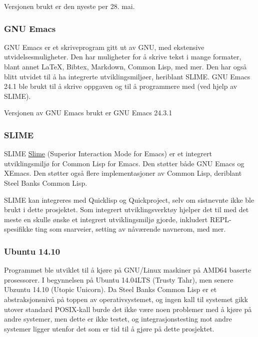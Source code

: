\documentclass[norsk, 11pt, a4paper]{article}
\begin{document}
Versjonen brukt er den nyeste per 28. mai.



\subsubsection{GNU Emacs}



GNU Emacs er et skriveprogram gitt ut av GNU, med ekstensive utvidelsesmuligheter. Den har muligheter for å skrive tekst i mange formater, blant annet LaTeX, Bibtex, Markdown, Common Lisp, med mer. Den har også blitt utvidet til å ha integrerte utviklingsmiljøer, heriblant SLIME. GNU Emacs 24.1 ble brukt til å skrive oppgaven og til å programmere med (ved hjelp av SLIME).



Versjonen av GNU Emacs brukt er GNU Emacs 24.3.1



\subsubsection{SLIME}



SLIME \href{https://common-lisp.net/project/slime/}{Slime} (Superior Interaction Mode for Emacs) er et integrert utviklingsmiljø for Common Lisp for Emacs. Den støtter både GNU Emacs og XEmacs. Den støtter også flere implementasjoner av Common Lisp, deriblant Steel Banks Common Lisp.



SLIME kan integreres med Quicklisp og Quickproject, selv om sistnevnte ikke ble brukt i dette prosjektet.
Som integrert utviklingsverktøy hjelper det til med det meste en skulle ønske et integrert utviklingsmiljø gjorde, inkludert REPL-spesifikke ting som snarveier, setting av nåværende navnerom, med mer.



\subsubsection{Ubuntu 14.10}



Programmet ble utviklet til å kjøre på GNU/Linux maskiner på AMD64 baserte prosessorer. I begynnelsen på Ubuntu 14.04LTS (Trusty Tahr), men senere Ubzuntu 14.10 (Utopic Unicorn). Da Steel Banks Common Lisp er et abstraksjonsnivå på toppen av operativsystemet, og ingen kall til systemet gikk utover standard POSIX-kall burde det ikke være noen problemer med å kjøre på andre systemer, men dette er ikke testet, og integrasjonstesting mot andre systemer ligger utenfor det som er tid til å gjøre på dette prosjektet.
\end{document}
